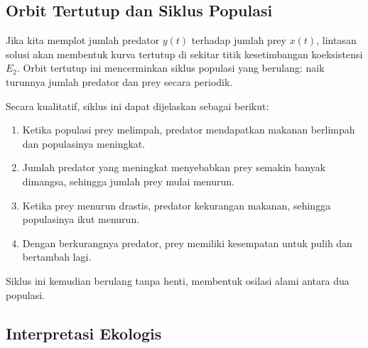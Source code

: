 \documentclass{bukumjh}
\begin{document}
\subsection*{Orbit Tertutup dan Siklus Populasi}

Jika kita memplot jumlah predator $y(t)$ terhadap jumlah prey $x(t)$, lintasan solusi akan membentuk kurva tertutup di sekitar titik kesetimbangan koeksistensi $E_2$. Orbit tertutup ini mencerminkan siklus populasi yang berulang: naik turunnya jumlah predator dan prey secara periodik.

Secara kualitatif, siklus ini dapat dijelaskan sebagai berikut:
\begin{enumerate}
    \item Ketika populasi prey melimpah, predator mendapatkan makanan berlimpah dan populasinya meningkat.
    \item Jumlah predator yang meningkat menyebabkan prey semakin banyak dimangsa, sehingga jumlah prey mulai menurun.
    \item Ketika prey menurun drastis, predator kekurangan makanan, sehingga populasinya ikut menurun.
    \item Dengan berkurangnya predator, prey memiliki kesempatan untuk pulih dan bertambah lagi.
\end{enumerate}

Siklus ini kemudian berulang tanpa henti, membentuk osilasi alami antara dua populasi.

\begin{center}
\end{center}

\subsection*{Interpretasi Ekologis}
\end{document}
